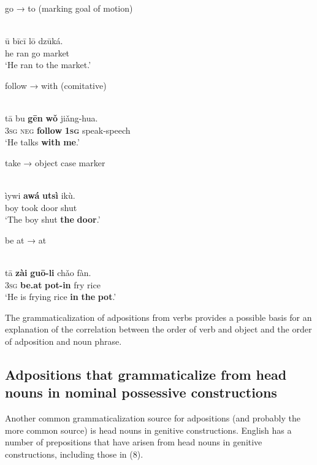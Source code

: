 \documentclass[output=paper]{langsci/langscibook}
\begin{document}
go → to (marking goal of motion)

\ea\label{ex:dryer:}
\\
\gll   ū  bīcī  lō  dzūká.\\
       he  ran  go  market\\
\glt   ‘He ran to the market.’
\z

follow → with (comitative)

\ea\label{ex:dryer:}
\\
\gll   tā  bu  \textbf{gēn}  \textbf{wǒ}  jiǎng-hua.\\
       3\textsc{sg}  \textsc{neg}  \textbf{follow}  \textbf{\textsc{1sg}}  speak-speech\\
\glt   ‘He talks \textbf{with} \textbf{me}.’
\z

take → object case marker

\ea\label{ex:dryer:}
\\
\gll     ìywi  \textbf{awá}  \textbf{utsì}  ikù.\\
         boy  took  door  shut\\
\glt     ‘The boy shut \textbf{the} \textbf{door}.’
\z

be at → at

\ea\label{ex:dryer:}
\\
\gll     tā  \textbf{zài}  \textbf{guō-li}  chǎo  fàn.\\
         3\textsc{sg}  \textbf{be.at}  \textbf{pot-in}  fry  rice\\
\glt     ‘He is frying rice \textbf{in} \textbf{the} \textbf{pot}.’
\z

The grammaticalization of adpositions from verbs provides a possible basis for an explanation of the correlation between the order of verb and object and the order of adposition and noun phrase.

\subsection{Adpositions that grammaticalize from head nouns in nominal possessive constructions}

Another common grammaticalization source for adpositions (and probably the more common source) is head nouns in genitive constructions. English has a number of prepositions that have arisen from head nouns in genitive constructions, including those in (8).
\end{document}
